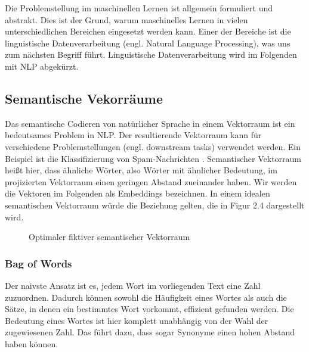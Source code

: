 \documentclass[12pt,letterpaper,ngerman]{article}
\begin{document}
Die Problemstellung im maschinellen Lernen ist allgemein formuliert und abstrakt.
Dies ist der Grund, warum maschinelles Lernen in vielen unterschiedlichen 
Bereichen eingesetzt werden kann. Einer der Bereiche ist die linguistische
Datenverarbeitung (engl. Natural Language Processing), was uns zum nächsten 
Begriff führt. Linguistische Datenverarbeitung wird im Folgenden mit NLP abgekürzt.

\subsection{Semantische Vekorräume}
Das semantische Codieren von natürlicher Sprache in einem Vektorraum 
ist ein bedeutsames Problem in NLP. %
Der resultierende Vektorraum kann
für verschiedene Problemstellungen (engl. downstream tasks) verwendet
werden. Ein Beispiel ist die Klassifizierung von Spam-Nachrichten 
\cite{Ball2019}.
Semantischer Vektorraum heißt hier, dass ähnliche Wörter, also Wörter 
mit ähnlicher Bedeutung, im projizierten Vektorraum einen geringen 
Abstand zueinander haben. Wir werden die Vektoren im Folgenden als
Embeddings bezeichnen. In einem idealen semantischen Vektorraum würde 
die Beziehung gelten, die in Figur 2.4 dargestellt wird.
\begin{figure}[H]
  \begin{center}
  \end{center}
  \caption{Optimaler fiktiver semantischer Vektorraum}
\end{figure}
\subsubsection{Bag of Words}
Der naivste Ansatz ist es, jedem Wort im vorliegenden Text eine Zahl 
zuzuordnen. Dadurch können sowohl die Häufigkeit eines Wortes als auch
die Sätze, in denen ein bestimmtes Wort vorkommt, effizient gefunden 
werden. Die Bedeutung eines Wortes ist hier komplett unabhängig von 
der Wahl der zugewiesenen Zahl. Das führt dazu, dass sogar Synonyme einen
hohen Abstand haben können.
\end{document}
